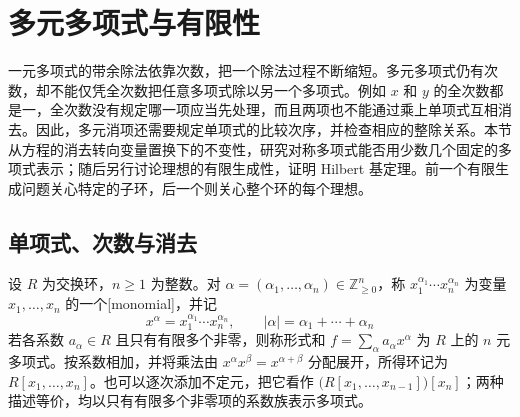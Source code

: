 
\section{多元多项式与有限性}
\label{b1:sec:1204}

%
%
%

一元多项式的带余除法依靠次数，把一个除法过程不断缩短。多元多项式仍有次数，却不能仅凭全次数把任意多项式除以另一个多项式。例如 \(x\) 和 \(y\) 的全次数都是一，全次数没有规定哪一项应当先处理，而且两项也不能通过乘上单项式互相消去。因此，多元消项还需要规定单项式的比较次序，并检查相应的整除关系。本节从方程的消去转向变量置换下的不变性，研究对称多项式能否用少数几个固定的多项式表示；随后另行讨论理想的有限生成性，证明 Hilbert 基定理。前一个有限生成问题关心特定的子环，后一个则关心整个环的每个理想。

\subsection{单项式、次数与消去}
\label{b1:subsec:1204:01}

设 \(R\) 为交换环，\(n\geq1\) 为整数。对 \(\alpha=(\alpha_1,\ldots,\alpha_n)\in\mathbb Z_{\geq0}^n\)，称 \(x_1^{\alpha_1}\cdots x_n^{\alpha_n}\) 为变量 \(x_1,\ldots,x_n\) 的一个[monomial]，并记
\[
	x^\alpha=x_1^{\alpha_1}\cdots x_n^{\alpha_n},\qquad |\alpha|=\alpha_1+\cdots+\alpha_n
\]
若各系数 \(a_\alpha\in R\) 且只有有限多个非零，则称形式和 \(f=\sum_\alpha a_\alpha x^\alpha\) 为 \(R\) 上的 \(n\) 元多项式。按系数相加，并将乘法由 \(x^\alpha x^\beta=x^{\alpha+\beta}\) 分配展开，所得环记为 \(R[x_1,\ldots,x_n]\)。也可以逐次添加不定元，把它看作 \(\bigl(R[x_1,\ldots,x_{n-1}]\bigr)[x_n]\)；两种描述等价，均以只有有限多个非零项的系数族表示多项式。

